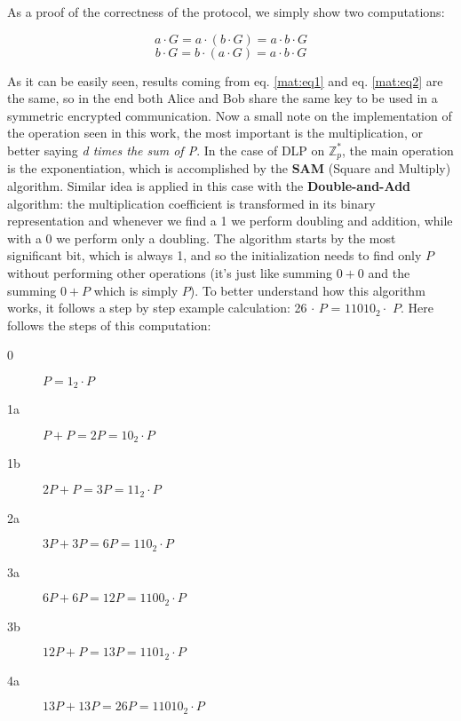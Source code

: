 \documentclass{article}
\begin{document}
As a proof of the correctness of the protocol, we simply show two computations:

\begin{equation}
	a \cdot G = a \cdot (b \cdot G) = a \cdot b \cdot G
	\label{mat:eq1}
\end{equation}
\begin{equation}
	b \cdot G = b \cdot (a \cdot G) = a \cdot b \cdot G
	\label{mat:eq2}
\end{equation}

As it can be easily seen, results coming from eq. \ref{mat:eq1} and eq. \ref{mat:eq2} are the same, so in the end both Alice and Bob share the same key to be used in a symmetric encrypted communication.\newline
Now a small note on the implementation of the operation seen in this work, the most important is the multiplication, or better saying \textit{d times the sum of P}. In the case of DLP on $\mathbb{Z}_p^*$, the main operation is the exponentiation, which is accomplished by the \textbf{SAM} (Square and Multiply) algorithm. Similar idea is applied in this case with the \textbf{Double-and-Add} algorithm: the multiplication coefficient is transformed in its binary representation and whenever we find a 1 we perform doubling and addition, while with a 0 we perform only a doubling. The algorithm starts by the most significant bit, which is always 1, and so the initialization needs to find only $P$ without performing other operations (it's just like summing $0+0$ and the summing $0+P$ which is simply $P$). To better understand how this algorithm works, it follows a step by step example calculation: 26 $\cdot$ $P$ = $11010_2 \cdot$ $P$. Here follows the steps of this computation:

\begin{description}
	\item[0 ] $P = 1_2 \cdot P$
	\item[1a] $P + P = 2P = 10_2 \cdot P$
	\item[1b] $2P + P = 3P = 11_2 \cdot P$
	\item[2a] $3P + 3P = 6P = 110_2 \cdot P$
	\item[3a] $6P + 6P = 12P = 1100_2 \cdot P$
	\item[3b] $12P + P = 13P = 1101_2 \cdot P$
	\item[4a] $13P + 13P = 26P = 11010_2 \cdot P$
\end{description}

\end{document}
